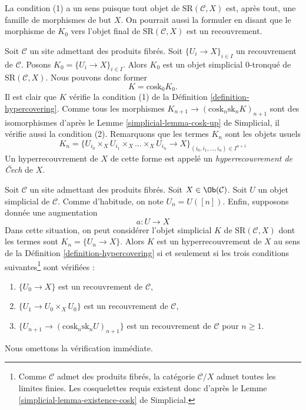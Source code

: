 \noindent
La condition (1) a un sens puisque tout objet de
$\text{SR}(\mathcal{C}, X)$ est, après tout, une famille
de morphismes de but $X$. On pourrait aussi la
formuler en disant que le morphisme de $K_0$ vers
l'objet final de $\text{SR}(\mathcal{C}, X)$
est un recouvrement.

\begin{example}
\label{example-cech}
Soit $\mathcal{C}$ un site admettant des produits fibrés.
Soit $\{U_i \to X\}_{i \in I}$ un recouvrement de $\mathcal{C}$.
Posons $K_0 = \{U_i \to X\}_{i \in I}$.
Alors $K_0$ est un objet simplicial $0$-tronqué de
$\text{SR}(\mathcal{C}, X)$. Nous pouvons donc former
$$
K = \text{cosk}_0 K_0.
$$
Il est clair que $K$ vérifie la condition (1) de la Définition \ref{definition-hypercovering}.
Comme tous les morphismes $K_{n + 1} \to (\text{cosk}_n \text{sk}_n K)_{n + 1}$
sont des isomorphismes d'après le
Lemme \ref{simplicial-lemma-cosk-up} de Simplicial,
il vérifie aussi la condition (2). Remarquons que
les termes $K_n$ sont les objets usuels
$$
K_n = \{
U_{i_0} \times_X U_{i_1} \times_X \ldots \times_X U_{i_n} \to X
\}_{(i_0, i_1, \ldots, i_n) \in I^{n + 1}}
$$
Un hyperrecouvrement de $X$ de cette forme est appelé un
{\it hyperrecouvrement de {\v C}ech} de $X$.
\end{example}

\begin{example}
\label{example-hypercovering-in-C}
Soit $\mathcal{C}$ un site admettant des produits fibrés. Soit
$X \in \Ob(\mathcal{C})$. Soit $U$ un objet simplicial de $\mathcal{C}$.
Comme d'habitude, on note $U_n = U([n])$. Enfin, supposons donnée une augmentation
$$
a : U \to X
$$
Dans cette situation, on peut considérer l'objet simplicial $K$
de $\text{SR}(\mathcal{C}, X)$ dont les termes sont $K_n = \{U_n \to X\}$.
Alors $K$ est un hyperrecouvrement de $X$ au sens de la
Définition \ref{definition-hypercovering}
si et seulement si les trois
conditions suivantes\footnote{Comme $\mathcal{C}$ admet des produits fibrés, la
catégorie $\mathcal{C}/X$ admet toutes les limites finies.
Les cosquelettes requis existent donc d'après le
Lemme \ref{simplicial-lemma-existence-cosk} de Simplicial.} sont vérifiées :
\begin{enumerate}
\item $\{U_0 \to X\}$ est un recouvrement de $\mathcal{C}$,
\item $\{U_1 \to U_0 \times_X U_0\}$ est un recouvrement de $\mathcal{C}$,
\item $\{U_{n + 1} \to (\text{cosk}_n\text{sk}_n U)_{n + 1}\}$
est un recouvrement de $\mathcal{C}$ pour $n \geq 1$.
\end{enumerate}
Nous omettons la vérification immédiate.
\end{example}

